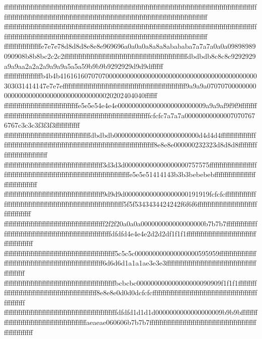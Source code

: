 {{{ffffffffffffffffffffffffffffffffffffffffffffffffffffffffffffffffffffffffffffffffffffffffffffffffffffffffffffffffffffffffffffffffffffffffffffffffffffffffffffffffffffffffffffffffffffffffffffffffffffffffffffffffffffffffffffff
ffffffffffffffffffffffffffffffffffffffffffffffffffffffffffffffffffffffffffffffffffffffffffffffffffffffffffffffffffffffffffffffffffffffffffffffffffffffffffffffffffffffffffffffffffffffffffffffffffffffffffffffffffffffffffffff
ffffffffffffffffffe7e7e78d8d8d8e8e8e969696a0a0a0a8a8a8abababa7a7a7a0a0a09898989090908b8b8bc2c2c2ffffffffffffffffffffffffffffffffffffffffffffffffffffffffffffdbdbdb8c8c8c9292929a9a9aa2a2a2a9a9a9a5a5a59b9b9b9292929d9d9dffffff
ffffffffffffffffffb4b4b41616160707070000000000000000000000000000000000000000000303031414147e7e7effffffffffffffffffffffffffffffffffffffffffffffffffffffffffff9a9a9a070707000000000000000000000000000000000000020202404040ffffff
ffffffffffffffffffffffffffffffffffffe5e5e54e4e4e0000000000000000000000009a9a9af9f9f9fffffffffffffffffffffffffffffffffffffffffffffffffffffffffffffffffffffffffffffffcfcfc7a7a7a000000000000070707676767c3c3c3f3f3f3ffffffffffff
ffffffffffffffffffffffffffffffffffffffffffdbdbdb000000000000000000000000d4d4d4ffffffffffffffffffffffffffffffffffffffffffffffffffffffffffffffffffffffffffffffffffffffffff8e8e8e000000232323d8d8d8ffffffffffffffffffffffffffffff
ffffffffffffffffffffffffffffffffffffffffffffffff3d3d3d000000000000000000757575ffffffffffffffffffffffffffffffffffffffffffffffffffffffffffffffffffffffffffffffffffffe5e5e51414143b3b3bebebebffffffffffffffffffffffffffffffffffff
ffffffffffffffffffffffffffffffffffffffffffffffff9d9d9d000000000000000000191919fcfcfcfffffffffffffffffffffffffffffffffffffffffffffffffffffffffffffffffffffffff5f5f5343434424242f6f6f6ffffffffffffffffffffffffffffffffffffffffff
fffffffffffffffffffffffffffffffffffffffffffffffff2f2f20a0a0a000000000000000000b7b7b7fffffffffffffffffffffffffffffffffffffffffffffffffffffffffffffffffffdfdfd4e4e4e2d2d2df1f1f1ffffffffffffffffffffffffffffffffffffffffffffffff
ffffffffffffffffffffffffffffffffffffffffffffffffffffff5c5c5c000000000000000000595959ffffffffffffffffffffffffffffffffffffffffffffffffffffffffffffffffff6d6d6d1a1a1ae3e3e3ffffffffffffffffffffffffffffffffffffffffffffffffffffff
ffffffffffffffffffffffffffffffffffffffffffffffffffffffbcbcbc000000000000000000090909f1f1f1ffffffffffffffffffffffffffffffffffffffffffffffffffffff8e8e8e0d0d0dcfcfcfffffffffffffffffffffffffffffffffffffffffffffffffffffffffffff
fffffffffffffffffffffffffffffffffffffffffffffffffffffffdfdfd1d1d1d0000000000000000009b9b9bffffffffffffffffffffffffffffffffffffffffffffffffaeaeae060606b7b7b7ffffffffffffffffffffffffffffffffffffffffffffffffffffffffffffffffff
}}}
